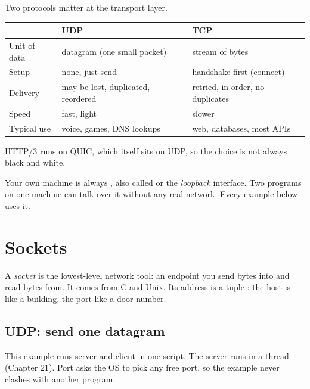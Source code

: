 Two protocols matter at the transport layer.

\begin{center}
\begin{tabularx}{\linewidth}{@{}l X X@{}}
\toprule
 & \textbf{UDP} & \textbf{TCP} \\
\midrule
Unit of data      & datagram (one small packet)       & stream of bytes \\
Setup             & none, just send                   & handshake first (connect) \\
Delivery          & may be lost, duplicated, reordered & retried, in order, no duplicates \\
Speed             & fast, light                       & slower \\
Typical use       & voice, games, DNS lookups         & web, databases, most APIs \\
\bottomrule
\end{tabularx}
\end{center}

HTTP/3 runs on QUIC, which itself sits on UDP, so the choice is not always black and white.

Your own machine is always , also called  or the
\emph{loopback} interface. Two programs on one machine can talk over it without any
real network. Every example below uses it.

\section{Sockets}

A \emph{socket} is the lowest-level network tool: an endpoint you send bytes into and
read bytes from. It comes from C and Unix. Its address is a tuple
: the host is like a building, the port like a door number.

\subsection{UDP: send one datagram}

This example runs server and client in one script. The server runs in a thread (Chapter
21). Port  asks the OS to pick any free port, so the example never clashes with
another program.

